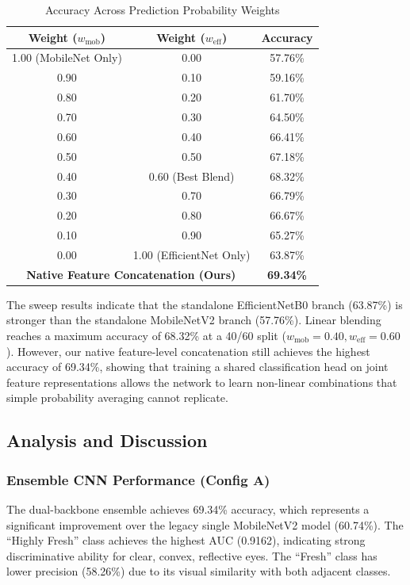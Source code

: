 \documentclass[conference]{IEEEtran}
\begin{document}
\begin{table}[h]
\centering
\caption{Accuracy Across Prediction Probability Weights}
\label{tab:weight_sweep}
\begin{tabular}{ccc}
\toprule
\textbf{Weight ($w_{\text{mob}}$)} & \textbf{Weight ($w_{\text{eff}}$)} & \textbf{Accuracy} \\
\midrule
1.00 (MobileNet Only) & 0.00 & 57.76\% \\
0.90 & 0.10 & 59.16\% \\
0.80 & 0.20 & 61.70\% \\
0.70 & 0.30 & 64.50\% \\
0.60 & 0.40 & 66.41\% \\
0.50 & 0.50 & 67.18\% \\
0.40 & 0.60 (Best Blend) & 68.32\% \\
0.30 & 0.70 & 66.79\% \\
0.20 & 0.80 & 66.67\% \\
0.10 & 0.90 & 65.27\% \\
0.00 & 1.00 (EfficientNet Only) & 63.87\% \\
\midrule
\multicolumn{2}{c}{\textbf{Native Feature Concatenation (Ours)}} & \textbf{69.34\%} \\
\bottomrule
\end{tabular}
\end{table}

The sweep results indicate that the standalone EfficientNetB0 branch (63.87\%) is stronger than the standalone MobileNetV2 branch (57.76\%). Linear blending reaches a maximum accuracy of 68.32\% at a 40/60 split ($w_{\text{mob}}=0.40, w_{\text{eff}}=0.60$). However, our native feature-level concatenation still achieves the highest accuracy of 69.34\%, showing that training a shared classification head on joint feature representations allows the network to learn non-linear combinations that simple probability averaging cannot replicate.

\subsection{Analysis and Discussion}

\subsubsection{Ensemble CNN Performance (Config A)}
The dual-backbone ensemble achieves 69.34\% accuracy, which represents a significant improvement over the legacy single MobileNetV2 model (60.74\%). The ``Highly Fresh'' class achieves the highest AUC (0.9162), indicating strong discriminative ability for clear, convex, reflective eyes. The ``Fresh'' class has lower precision (58.26\%) due to its visual similarity with both adjacent classes.
\end{document}
